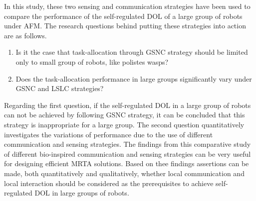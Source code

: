 In this study, these two sensing and communication strategies have been used to compare the performance of the self-regulated DOL of a large group of robots under AFM. %
The research questions behind putting these strategies into action are as follows.
\begin{enumerate}
\item Is it the case that task-allocation through GSNC strategy should be limited only to small group of robots, like polistes wasps?
\item 
Does the task-allocation performance in large groups significantly vary under GSNC and LSLC strategies?
\end{enumerate}
Regarding the first question, if the self-regulated DOL in a large group of robots can not be achieved by following GSNC strategy, it can be concluded that this strategy is inappropriate for a large group. The second question quantitatively investigates the variations of performance due to the use of different communication and sensing strategies. The findings from this comparative study of different bio-inspired communication and sensing strategies can be very useful for designing efficient MRTA solutions. Based on thee findings assertions can be made, both quantitatively and qualitatively, whether local communication and local interaction should be considered as the prerequisites to achieve self-regulated DOL in large groups of robots.

